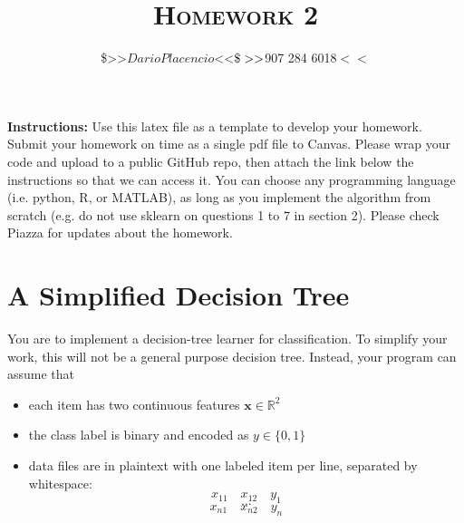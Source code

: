 \documentclass[a4paper]{article}
\title{\textsc{Homework 2}} %
\author{
\$>>$Dario Placencio$<<$\\
\$>>$907 284 6018$<<$\\
}
\date{}
\theoremstyle{definition}
\newcommand{\RR}{\mathbb{R}}
\def\x{\mathbf x}
\begin{document}
\maketitle 


\textbf{Instructions:} 
Use this latex file as a template to develop your homework. Submit your homework on time as a single pdf file to Canvas. Please wrap your code and upload to a public GitHub repo, then attach the link below the instructions so that we can access it. You can choose any programming language (i.e. python, R, or MATLAB), as long as you implement the algorithm from scratch (e.g. do not use sklearn on questions 1 to 7 in section 2). Please check Piazza for updates about the homework.

\section{A Simplified Decision Tree}
You are to implement a decision-tree learner for classification.
To simplify your work, this will not be a general purpose decision tree.  Instead, your program can assume that
\begin{itemize}
\item each item has two continuous features $\x \in \RR^2$
\item the class label is binary and encoded as $y \in \{0,1\}$
\item data files are in plaintext with one labeled item per line, separated by whitespace:
$$x_{11} \quad x_{12} \quad y_1$$
$$...$$
$$x_{n1} \quad x_{n2} \quad y_n$$
\end{itemize}
\end{document}
